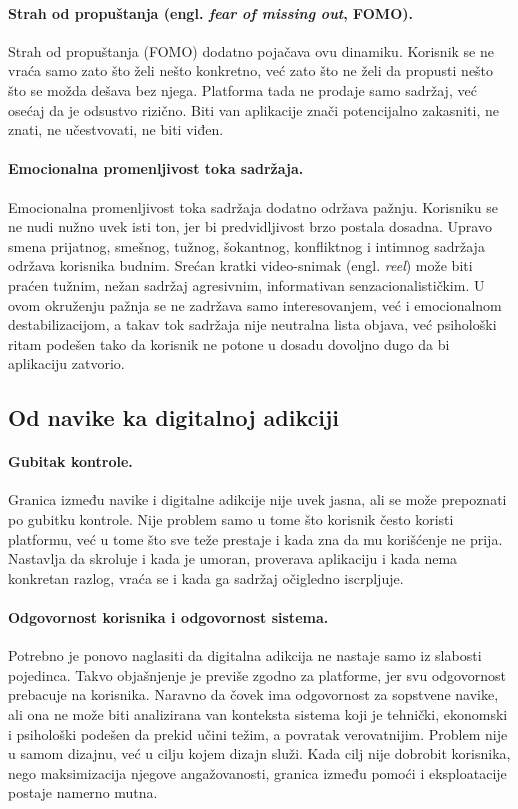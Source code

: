 \paragraph{Strah od propuštanja (engl. \textit{fear of missing out}, FOMO).}
Strah od propuštanja (FOMO) dodatno pojačava ovu dinamiku. Korisnik se ne vraća samo zato što želi nešto konkretno, već zato što ne želi da propusti nešto što se možda dešava bez njega. Platforma tada ne prodaje samo sadržaj, već osećaj da je odsustvo rizično. Biti van aplikacije znači potencijalno zakasniti, ne znati, ne učestvovati, ne biti viđen.

\paragraph{Emocionalna promenljivost toka sadržaja.}
Emocionalna promenljivost toka sadržaja dodatno održava pažnju. Korisniku se ne nudi nužno uvek isti ton, jer bi predvidljivost brzo postala dosadna. Upravo smena prijatnog, smešnog, tužnog, šokantnog, konfliktnog i intimnog sadržaja održava korisnika budnim. Srećan kratki video-snimak (engl. \textit{reel}) može biti praćen tužnim, nežan sadržaj agresivnim, informativan senzacionalističkim. U ovom okruženju pažnja se ne zadržava samo interesovanjem, već i emocionalnom destabilizacijom, a takav tok sadržaja nije neutralna lista objava, već psihološki ritam podešen tako da korisnik ne potone u dosadu dovoljno dugo da bi aplikaciju zatvorio.

\subsection{Od navike ka digitalnoj adikciji}

\paragraph{Gubitak kontrole.}
Granica između navike i digitalne adikcije nije uvek jasna, ali se može prepoznati po gubitku kontrole. Nije problem samo u tome što korisnik često koristi platformu, već u tome što sve teže prestaje i kada zna da mu korišćenje ne prija. Nastavlja da skroluje i kada je umoran, proverava aplikaciju i kada nema konkretan razlog, vraća se i kada ga sadržaj očigledno iscrpljuje.

\paragraph{Odgovornost korisnika i odgovornost sistema.}
Potrebno je ponovo naglasiti da digitalna adikcija ne nastaje samo iz slabosti pojedinca. Takvo objašnjenje je previše zgodno za platforme, jer svu odgovornost prebacuje na korisnika. Naravno da čovek ima odgovornost za sopstvene navike, ali ona ne može biti analizirana van konteksta sistema koji je tehnički, ekonomski i psihološki podešen da prekid učini težim, a povratak verovatnijim. Problem nije u samom dizajnu, već u cilju kojem dizajn služi. Kada cilj nije dobrobit korisnika, nego maksimizacija njegove angažovanosti, granica između pomoći i eksploatacije postaje namerno mutna.

